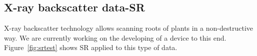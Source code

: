 \documentclass[10pt,twocolumn,letterpaper]{article}
\begin{document}


\subsection{X-ray backscatter data-SR}

X-ray backscatter technology allows scanning roots of plants in a non-destructive way. We are currently working on the developing of a device to this end. Figure~\ref{fig:srtest} shows SR applied to this type of data.
\end{document}
